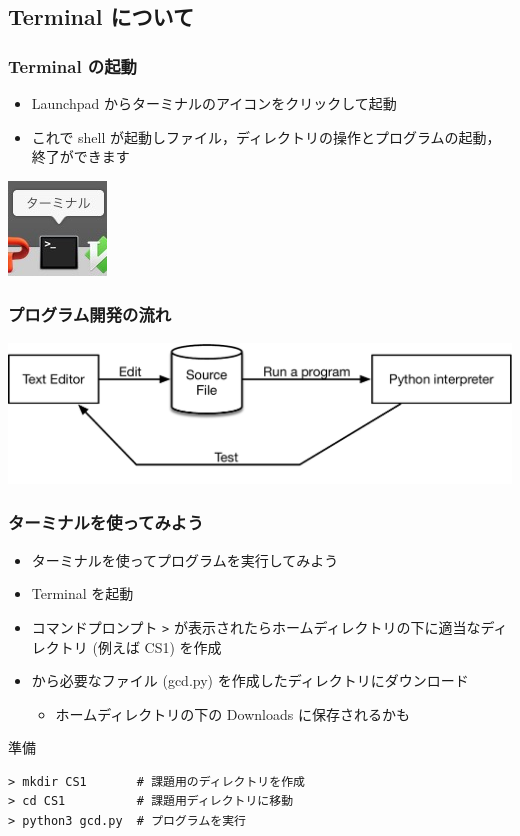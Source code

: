 %
%
\subsection{Terminal について}
\begin{frame}[containsverbatim]
\frametitle{Terminal の起動}
  \begin{itemize}
\item Launchpad からターミナルのアイコンをクリックして起動
\item これで shell が起動しファイル，ディレクトリの操作とプログラムの起動，終了ができます
  \end{itemize}
  \begin{center}
\includegraphics[scale=0.5]{./Figure/elementaryCS-figTermIcon.jpg}
  \end{center}
\end{frame}
\begin{frame}[containsverbatim]
\frametitle{プログラム開発の流れ}
  \begin{center}
\includegraphics[scale=0.3]{./Figure/CS-figEditAndRun.pdf}
  \end{center}
\end{frame}
\begin{frame}[fragile]
\frametitle{ターミナルを使ってみよう}
  \begin{itemize}
\item ターミナルを使ってプログラムを実行してみよう
\item Terminal を起動
\item コマンドプロンプト \verb|>| が表示されたらホームディレクトリの下に適当なディレクトリ (例えば CS1) を作成
\item \href{https://sites.google.com/presystems.xyz/elementarycs/top}{} から必要なファイル (gcd.py) を作成したディレクトリにダウンロード
    \begin{itemize}
\item ホームディレクトリの下の Downloads に保存されるかも
    \end{itemize}
  \end{itemize}
  \begin{itembox}{準備}
\scriptsize
    \begin{verbatim}
> mkdir CS1       # 課題用のディレクトリを作成
> cd CS1          # 課題用ディレクトリに移動
> python3 gcd.py  # プログラムを実行
    \end{verbatim}
  \end{itembox}
\end{frame}
%
%
